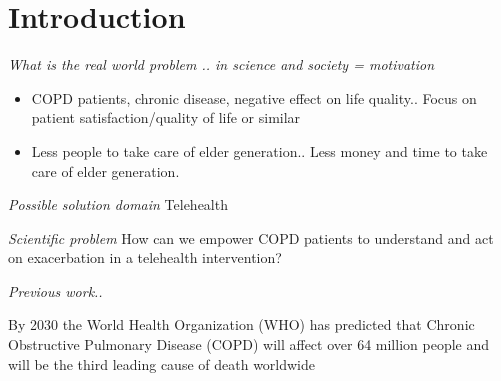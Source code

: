 \section{Introduction}

\textit{What is the real world problem .. in science and society = motivation}
\begin{itemize}
\item COPD patients, chronic disease, negative effect on life quality.. Focus on patient satisfaction/quality of life or similar 
\item Less people to take care of elder generation.. Less money and time to take care of elder generation. 
\end{itemize}

\textit{Possible solution domain}
Telehealth

\textit{Scientific problem}
How can we empower COPD patients to understand and act on exacerbation in a telehealth intervention? 

\textit{Previous work..}



By 2030 the World Health Organization (WHO) has predicted that Chronic Obstructive Pulmonary Disease (COPD) will affect over 64 million people and will be the third leading cause of death worldwide
